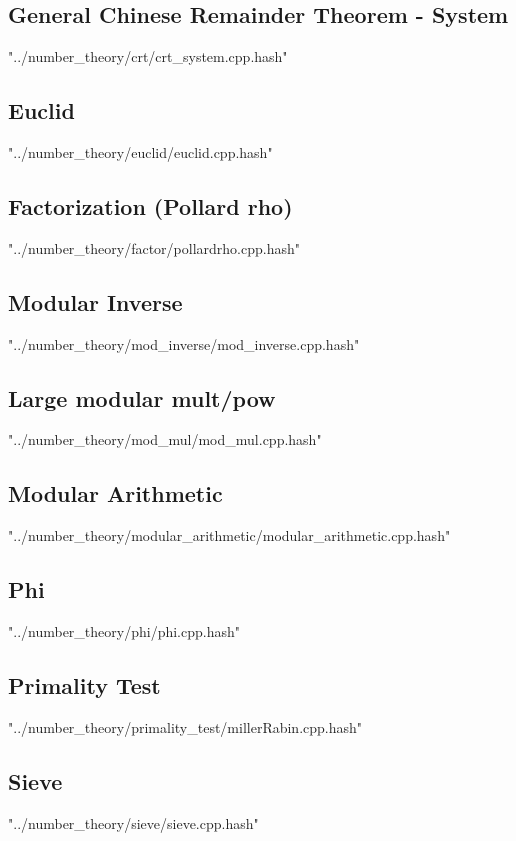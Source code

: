 \documentclass [a4paper,5pt,oneside, landscape]{article}
\begin{document}
\begin{multicols}{3}
\subsection{ General Chinese Remainder Theorem - System}
 {"../number_theory/crt/crt_system.cpp.hash"}


\subsection{ Euclid}
 {"../number_theory/euclid/euclid.cpp.hash"}


\subsection{ Factorization (Pollard rho)}
 {"../number_theory/factor/pollardrho.cpp.hash"}


\subsection{ Modular Inverse}
 {"../number_theory/mod_inverse/mod_inverse.cpp.hash"}


\subsection{ Large modular mult/pow}
 {"../number_theory/mod_mul/mod_mul.cpp.hash"}


\subsection{ Modular Arithmetic}
 {"../number_theory/modular_arithmetic/modular_arithmetic.cpp.hash"}


\subsection{ Phi}
 {"../number_theory/phi/phi.cpp.hash"}


\subsection{ Primality Test}
 {"../number_theory/primality_test/millerRabin.cpp.hash"}


\subsection{ Sieve}
 {"../number_theory/sieve/sieve.cpp.hash"}




\end{multicols}
\end{document}
